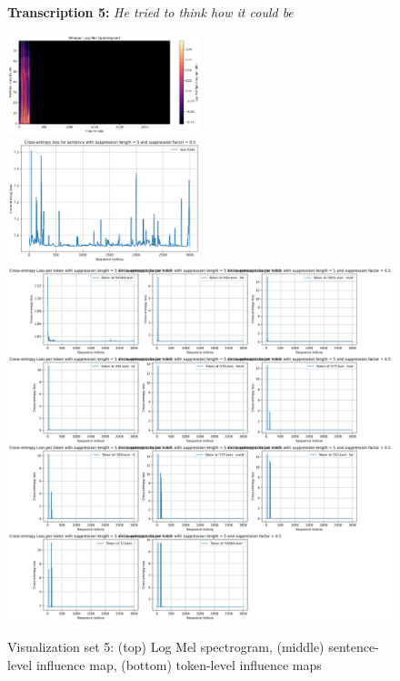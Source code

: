 \documentclass[../report.tex]{subfiles}
\begin{document}
    \begin{figure}[p]
        \centering
        \begin{minipage}{0.95\textwidth}
        \raggedright
        \textbf{Transcription 5:} \textit{He tried to think how it could be}
        \end{minipage}
        
        \includegraphics[width=0.5\textwidth]{figures/mel5.png}
        \includegraphics[width=0.5\textwidth]{figures/loss_diff_sentence_5_sentence.png}
        \includegraphics[width=\textwidth,height=0.5\textheight]{figures/loss_diff_sentence_5_word.png}
        \caption{Visualization set 5: (top) Log Mel spectrogram, (middle) sentence-level influence map, (bottom) token-level influence maps}
        \label{fig:viz_set5}
    \end{figure}


    
\end{document}
